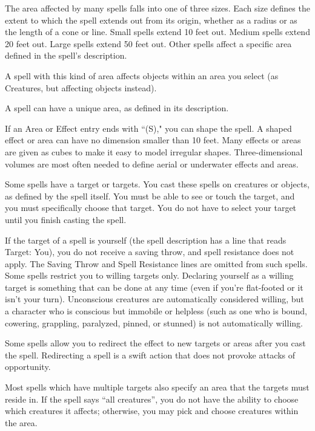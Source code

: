  The area affected by many spells falls into one of three sizes. Each size defines the extent to which the spell extends out from its origin, whether as a radius or as the length of a cone or line. Small spells extend 10 feet out. Medium spells extend 20 feet out. Large spells extend 50 feet out. Other spells affect a specific area defined in the spell's description.

 A spell with this kind of area affects objects within an area you select (as Creatures, but affecting objects instead).

 A spell can have a unique area, as defined in its description.

 If an Area or Effect entry ends with ``(S)," you can shape the spell. A shaped effect or area can have no dimension smaller than 10 feet. Many effects or areas are given as cubes to make it easy to model irregular shapes. Three-dimensional volumes are most often needed to define aerial or underwater effects and areas.

 Some spells have a target or targets. You cast these spells on creatures or objects, as defined by the spell itself. You must be able to see or touch the target, and you must specifically choose that target. You do not have to select your target until you finish casting the spell.

If the target of a spell is yourself (the spell description has a line that reads Target: You), you do not receive a saving throw, and spell resistance does not apply. The Saving Throw and Spell Resistance lines are omitted from such spells.
Some spells restrict you to willing targets only. Declaring yourself as a willing target is something that can be done at any time (even if you're flat-footed or it isn't your turn). Unconscious creatures are automatically considered willing, but a character who is conscious but immobile or helpless (such as one who is bound, cowering, grappling, paralyzed, pinned, or stunned) is not automatically willing.

Some spells allow you to redirect the effect to new targets or areas after you cast the spell. Redirecting a spell is a swift action that does not provoke attacks of opportunity.

Most spells which have multiple targets also specify an area that the targets must reside in. If the spell says ``all creatures'', you do not have the ability to choose which creatures it affects; otherwise, you may pick and choose creatures within the area.

